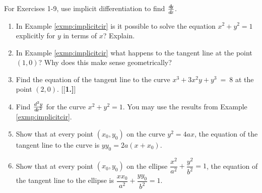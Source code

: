 \startexercises\label{sec3dot4}
{\small
{}

\par\noindent For Exercises 1-9, use implicit differentiation to find $\frac{d\negmedspace y}{d\!x}$.

\begin{enumerate}[\bfseries 1.]
  \item In Example \ref{exmp:implicitcir} is it possible to solve the equation
  $x^2 + y^2 = 1$ explicitly for $y$ in terms of $x$? Explain.
  \item In Example \ref{exmp:implicitcir} what happens to the tangent line
   at the point $(1,0)$? Why does this make sense geometrically?
  \item Find the equation of the tangent line to the curve
    $x^3 + 3x^2 y + y^3 ~=~ 8$ at the point $(2,0)$.
[{[\bfseries 1.]}]
 \item Find $\frac{d^2y}{d\!x^2}$ for the curve $x^2 + y^2 = 1$. You may use the
  results from Example \ref{exmp:implicitcir}.
 \item Show that at every point $(x_0,y_0)$ on the curve $y^2 = 4ax$, the
  equation of the tangent line to the curve is $y y_0 = 2a(x + x_0)$.
 \item\label{exer:elliptan} Show that at every point $(x_0,y_0)$ on the ellipse
  $\dfrac{x^2}{a^2} + \dfrac{y^2}{b^2} = 1$,
  the equation of the  tangent line to the ellipse is
  $\dfrac{x x_0}{a^2} + \dfrac{y y_0}{b^2} = 1$.

\end{enumerate}}
